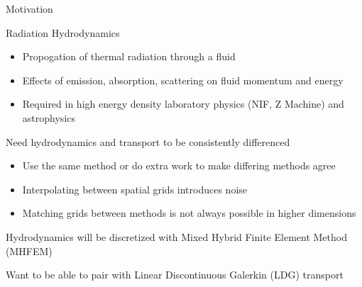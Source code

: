 \documentclass[10pt]{beamer}
\begin{document}
\begin{frame}{Motivation}

	\scriptsize
	Radiation Hydrodynamics 
	\vspace{-.05in}
	    \begin{itemize}
            \item Propogation of thermal radiation through a fluid
            \item Effects of emission, absorption, scattering on fluid momentum and energy 
	    	\item Required in high energy density laboratory physics (NIF, Z Machine) and astrophysics 
	    \end{itemize}


   	Need hydrodynamics and transport to be consistently differenced  
   	\vspace{-.05in}
   	\begin{itemize}
   		\item Use the same method or do extra work to make differing methods agree 
   	    \item Interpolating between spatial grids introduces noise 
   	    \item Matching grids between methods is not always possible in higher dimensions 
   	\end{itemize}

   	Hydrodynamics will be discretized with Mixed Hybrid Finite Element Method (MHFEM) 

   	Want to be able to pair with Linear Discontinuous Galerkin (LDG) transport 





\end{frame}
\end{document}
